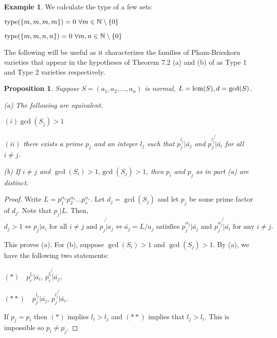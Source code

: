 \documentclass[12pt]{amsart}
\theoremstyle{plain}
\newtheorem{proposition}[subsection]{Proposition}
\theoremstyle{definition}
\newtheorem{example}[subsection]{Example}
\newcommand{\lcm}{		\operatorname{{\rm lcm}}}
\newcommand{\type}{		\operatorname{{\rm type}}}
\newcommand{\Nat}{\ensuremath{\mathbb{N}}}
\begin{document}
\begin{example} We calculate the type of a few sets:
	
	$\type(\{m,m,m,m\}) = 0 \  \forall m \in \Nat \setminus \{0\}$
	
	$\type(\{m,m,n,n\}) = 0 \  \forall m,n \in \Nat \setminus \{0\}$
	
	
\end{example}

The following will be useful as it characterizes the families of Pham-Brieskorn varieties that appear in the hypotheses of Theorem 7.2 (a) and (b) of \cite{daigle:hal-01691491} as Type 1 and Type 2 varieties respectively.  

\begin{proposition}\label{equivalentType}
	Suppose $S = (a_1, a_2, ..., a_n)$ is normal, $L = \lcm (S), d = \gcd(S)$.
	
	(a) The following are equivalent. 
	
	\quad $(i) \gcd(S_j) > 1$
	
	\quad $(ii)$ there exists a prime  $p_j$ and an integer $l_j$  such that $p_j^{l_j} | \bar{a_j}$ and $p_j^{l_j} \not{|} \bar{a_i}$ for all $i \neq j$.
	
	(b) If $i \neq j$ and $\gcd(S_i)>1$,$\gcd(S_j)>1$, then $p_i$ and $p_j$ as in part (a) are distinct.    
\end{proposition}

\begin{proof}
	
	
	Write $L = p_1^{\alpha_1}p_2^{\alpha_2}...p_s^{\alpha_s}$. Let $d_j = \gcd(S_j)$ and let $p_j$ be some prime factor of $d_j$. Note that $p_j | L$. Then, 
	$$d_j > 1  \iff  p_j | a_i \text{ for all $i \neq j$ and $p_j \not{|} a_j$} \iff \bar{a_j} = L / a_j \text{ satisfies  $p_j^{\alpha_j} | \bar{a_j}$ and $p_j^{\alpha_j} \not{|} \bar{a_i}$ for any $i \neq j$}.$$
	
	This proves (a). For (b), suppose $\gcd(S_i) > 1$ and $\gcd(S_j) > 1$. By (a), we have the following two statements:
	
	$(*) \quad p_i^{l_i} | \bar{a_i}$, $p_i^{l_i} \not{|}\bar{a_j}$,
	
	$(**) \quad p_j^{l_j} | \bar{a_j}$, $p_j^{l_j} \not{|}\bar{a_i}$. 
	
	If $p_j = p_i$ then $(*)$ implies $l_i > l_j$ and $(**)$ implies that $l_j > l_i$. This is impossible so $p_i \neq p_j$. 
	
	
\end{proof}
\end{document}

